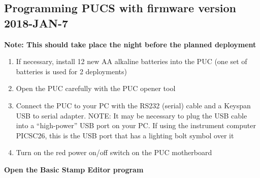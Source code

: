 \documentclass[]{book}
\begin{document}
\hypertarget{programming-pucs-with-firmware-version-2018-jan-7}{%
\subsection{Programming PUCS with firmware version 2018-JAN-7}\label{programming-pucs-with-firmware-version-2018-jan-7}}

\textbf{Note: This should take place the night before the planned deployment}

\begin{enumerate}
\def\labelenumi{\arabic{enumi}.}
\item
  If necessary, install 12 new AA alkaline batteries into the PUC (one set of batteries is used for 2 deployments)
\item
  Open the PUC carefully with the PUC opener tool
\item
  Connect the PUC to your PC with the RS232 (serial) cable and a Keyspan USB to serial adapter. NOTE: It may be necessary to plug the USB cable into a ``high-power'' USB port on your PC. If using the instrument computer PICSC26, this is the USB port that has a lighting bolt symbol over it
\item
  Turn on the red power on/off switch on the PUC motherboard
\end{enumerate}

\textbf{Open the Basic Stamp Editor program}
\end{document}

